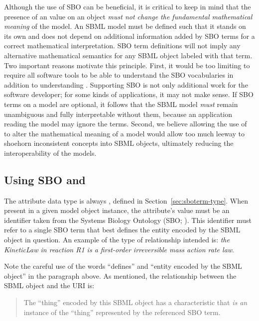 Although the use of SBO can be beneficial, it is critical to keep
in mind that the presence of an  value on an object
\emph{must not change the fundamental mathematical meaning} of the
model.  An SBML model must be defined such that it stands on its
own and does not depend on additional information added by SBO
terms for a correct mathematical interpretation.  SBO term
definitions will not imply any alternative mathematical semantics
for any SBML object labeled with that term.  Two important
reasons motivate this principle.  First, it would be too limiting
to require all software tools to be able to understand the SBO
vocabularies in addition to understanding .
Supporting SBO is not only additional work for the software
developer; for some kinds of applications, it may not make sense.
If SBO terms on a model are optional, it follows that the SBML
model \emph{must} remain unambiguous and fully interpretable
without them, because an application reading the model may ignore
the terms.  Second, we believe allowing the use of 
to alter the mathematical meaning of a model would allow
  too much leeway to shoehorn inconsistent concepts into SBML
objects, ultimately reducing the interoperability of the
models.

\subsection{Using SBO and }

The  attribute data type is always
, defined in Section~\ref{sec:sboterm-type}.
When present in a given model object instance, the
attribute's value must be an identifier taken from the
Systems Biology Ontology (SBO; \sboref).  This identifier must
refer to a single SBO term that best defines the entity encoded by
the SBML object in question.  An example of the type of
relationship intended is: \emph{the KineticLaw in reaction R1 is a
  first-order irreversible mass action rate law}.

Note the careful use of the words ``defines'' and ``entity encoded
by the SBML object'' in the paragraph above.  As mentioned, the
relationship between the SBML object and the URI is:

\begin{quote}
  The ``thing'' encoded by this SBML object has a characteristic that \emph{is an} instance
  of the ``thing'' represented by the referenced SBO term.
\end{quote}

